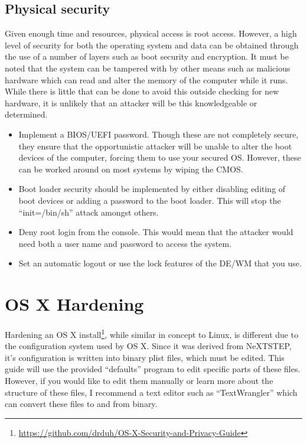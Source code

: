 \documentclass[a4paper,11pt]{report}
\begin{document}
				\subsection{Physical security}
					Given enough time and resources, physical access is root access. 
					However, a high level of security for both the operating system and data can be obtained through the use of a number of layers such as boot security and encryption. 
					It must be noted that the system can be tampered with by other means such as malicious hardware which can read and alter the memory of the computer while it runs. While there is little that can be done to avoid this outside checking for new hardware, it is unlikely that an attacker will be this knowledgeable or determined. 
					\begin{itemize}
						\item Implement a BIOS/UEFI password. 
							Though these are not completely secure, they ensure that the opportunistic attacker will be unable to alter the boot devices of the computer, forcing them to use your secured OS. 
							However, these can be worked around on most systems by wiping the CMOS. 
						\item Boot loader security should be implemented by either disabling editing of boot devices or adding a password to the boot loader. 
							This will stop the ``init=/bin/sh'' attack amongst others. 
						\item Deny root login from the console. 
							This would mean that the attacker would need both a user name and password to access the system. 
						\item Set an automatic logout or use the lock features of the DE/WM that you use. 
					\end{itemize}
	\section{OS X Hardening}
		Hardening an OS X install\footnote{\url{https://github.com/drduh/OS-X-Security-and-Privacy-Guide}}, while similar in concept to Linux, is different due to the configuration system used by OS X. 
		Since it was derived from NeXTSTEP, it's configuration is written into binary plist files, which must be edited. 
		This guide will use the provided ``defaults'' program to edit specific parts of these files. 
		However, if you would like to edit them manually or learn more about the structure of these files, I recommend a text editor such as ``TextWrangler'' which can convert these files to and from binary. 
\end{document}
